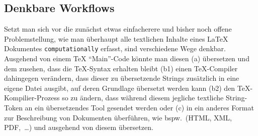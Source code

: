\subsection{Denkbare Workflows}
Setzt man sich vor die zunächst etwas einfacherere und bisher noch offene Problemstellung, wie man überhaupt alle textlichen Inhalte eines \LaTeX{} Dokumentes \texttt{computationally} erfasst,%
sind verschiedene Wege denkbar. Ausgehend von einem \TeX{} \enquote{Main}-Code könnte man diesen (a) übersetzen und dem zusehen, dass die \TeX{}-Syntax erhalten bleibt%
(b1) einen \TeX{}-Compiler dahingegen verändern, dass dieser zu übersetzende Strings zusätzlich in eine eigene Datei ausgibt, auf deren Grundlage übersetzt werden kann 
(b2) den \TeX{}-Kompilier-Prozess so zu ändern, dass während diesem jegliche textliche String-Token an ein übersetzendes Tool gesendet werden oder
(c) in ein anderes Format zur Beschreibung von Dokumenten überführen, wie bspw.\ (HTML, XML, PDF,~\ldots)%
und ausgehend von diesem übersetzen. 

